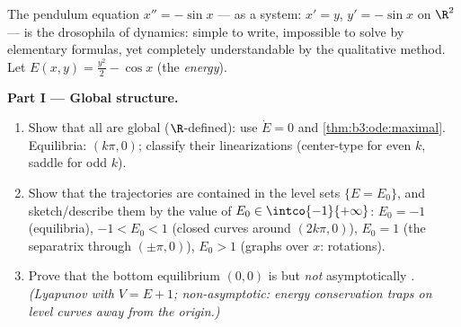\begin{problem}\label{pb:b3:ode:1}
The pendulum equation $x'' = -\sin x$ --- as a system: $x' =
y$, $y' = -\sin x$ on $\R^2$ --- is the drosophila of
dynamics: simple to write, impossible to solve by elementary
formulas, yet completely understandable by the qualitative
method. Let $E(x, y) = \frac{y^2}2 - \cos x$ (the
\emph{energy}).

\medskip
\noindent\textbf{Part I --- Global structure.}
\begin{enumerate}
  \item Show that all  are global
        ($\R$-defined): use $\dot E = 0$ and
        \cref{thm:b3:ode:maximal}. Equilibria: $(k\pi, 0)$;
        classify their linearizations (center-type for even
        $k$, saddle for odd $k$).
  \item Show that the trajectories are contained in the level
        sets $\{E = E_0\}$, and sketch/describe them by the
        value of $E_0 \in \intco{-1}{+\infty}$: $E_0 = -1$
        (equilibria), $-1 < E_0 < 1$ (closed curves around
        $(2k\pi, 0)$), $E_0 = 1$ (the separatrix through
        $(\pm\pi, 0)$), $E_0 > 1$ (graphs over $x$:
        rotations).
  \item Prove that the bottom equilibrium $(0,0)$ is 
        but \emph{not} asymptotically . \emph{(Lyapunov
        with $V = E + 1$; non-asymptotic: energy conservation
        traps  on level curves away from the
        origin.)}
\end{enumerate}


\end{problem}
